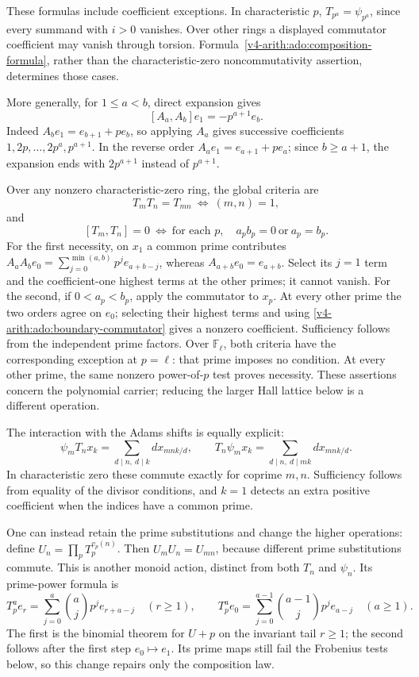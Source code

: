 These formulas include coefficient exceptions. In characteristic \(p\),
\(T_{p^a}=\psi_{p^a}\), since every summand with \(i>0\) vanishes.
Over other rings a displayed commutator coefficient may vanish through
torsion. Formula~\eqref{v4-arith:ado:composition-formula}, rather than the
characteristic-zero noncommutativity assertion, determines those cases.

More generally, for \(1\le a<b\), direct expansion gives
\begin{equation}
\label{v4-arith:ado:boundary-commutator}
 [A_a,A_b]e_1=-p^{a+1}e_b.
\end{equation}
Indeed \(A_be_1=e_{b+1}+pe_b\), so applying \(A_a\) gives
successive coefficients \(1,2p,\ldots,2p^a,p^{a+1}\).
In the reverse order \(A_ae_1=e_{a+1}+pe_a\); since \(b\ge a+1\),
the expansion ends with \(2p^{a+1}\) instead of \(p^{a+1}\).

Over any nonzero characteristic-zero ring, the global criteria are
\[
 T_mT_n=T_{mn}\ \Longleftrightarrow\ (m,n)=1,
\]
and
\[
 [T_m,T_n]=0\ \Longleftrightarrow\
 \text{for each }p,\quad a_pb_p=0\ \text{or}\ a_p=b_p.
\]
For the first necessity, on \(x_1\) a common prime contributes
\(A_aA_be_0=\sum_{j=0}^{\min(a,b)}p^je_{a+b-j}\), whereas
\(A_{a+b}e_0=e_{a+b}\). Select its \(j=1\) term and the coefficient-one
highest terms at the other primes; it cannot vanish. For the second,
if \(0<a_p<b_p\), apply the commutator to \(x_p\). At every other
prime the two orders agree on \(e_0\); selecting their highest terms
and using \eqref{v4-arith:ado:boundary-commutator} gives a nonzero
coefficient. Sufficiency follows from the independent prime factors.
Over \(\mathbb F_\ell\), both criteria have the corresponding exception
at \(p=\ell\): that prime imposes no condition. At every other prime,
the same nonzero power-of-\(p\) test proves necessity. These assertions
concern the polynomial carrier; reducing the larger Hall lattice below
is a different operation.

The interaction with the Adams shifts is equally explicit:
\[
 \psi_mT_nx_k=\sum_{d\mid n,\ d\mid k}d x_{mnk/d},\qquad
 T_n\psi_mx_k=\sum_{d\mid n,\ d\mid mk}d x_{mnk/d}.
\]
In characteristic zero these commute exactly for coprime \(m,n\).
Sufficiency follows from equality of the divisor conditions, and \(k=1\)
detects an extra positive coefficient when the indices have a common prime.

One can instead retain the prime substitutions and change the higher
operations: define \(U_n=\prod_pT_p^{v_p(n)}\). Then
\(U_mU_n=U_{mn}\), because different prime substitutions commute.
This is another monoid action, distinct from both \(T_n\) and \(\psi_n\).
Its prime-power formula is
\[
 T_p^a e_r=\sum_{j=0}^a\binom ajp^je_{r+a-j}\quad(r\ge1),\qquad
 T_p^a e_0=\sum_{j=0}^{a-1}\binom{a-1}jp^je_{a-j}\quad(a\ge1).
\]
The first is the binomial theorem for \(U+p\) on the invariant tail
\(r\ge1\); the second follows after the first step \(e_0\mapsto e_1\).
Its prime maps still fail the Frobenius tests below, so this change
repairs only the composition law.


